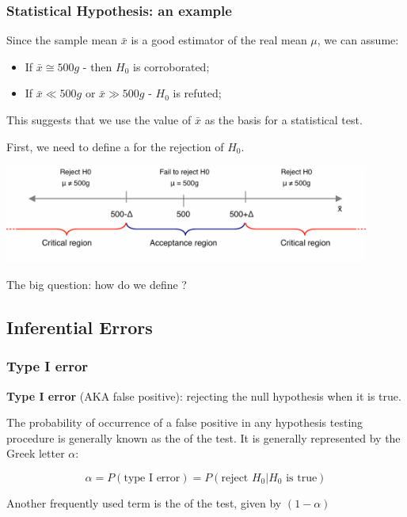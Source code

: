 \documentclass[10pt]{beamer}
\begin{document}
\begin{frame}
  \frametitle{Statistical Hypothesis: an example} 
  Since the sample mean $\bar{x}$ is a good estimator of the real mean
  $\mu$, we can assume:
  
  \medskip

  \begin{itemize}
  \item If $\bar{x} \cong 500g$ - then $H_0$ is corroborated;
  \item If $\bar{x} \ll 500g$ or $\bar{x} \gg 500g$ - $H_0$ is refuted;
  \end{itemize}
  
  \medskip

  This suggests that we use the value of $\bar{x}$ as the basis for a
  statistical test.
  
  \vfill

  First, we need to define a  for the rejection of $H_0$.
  \begin{center}
    \includegraphics[width=0.9\textwidth]{img/criticalregion}
  \end{center}
  \hfill The big question: how do we define \structure{$\Delta$}?
\end{frame}

\subsection{Inferential Errors}
\begin{frame}
  \frametitle{Type I error}
  \begin{block}{}
    {\bf Type I error} (AKA false positive): rejecting the null
    hypothesis when it is true.
  \end{block}
  
  \vspace{1cm}

  The probability of occurrence of a false positive in any hypothesis
  testing procedure is generally known as the  of the test. It is generally represented by the Greek
  letter $\alpha$:

  \begin{equation*}
    \alpha = P(\text{type I error}) = P(\text{reject } H_0|H_0 \text{ is true})
  \end{equation*}

  Another frequently used term is the  of
  the test, given by $(1-\alpha)$
\end{frame}
\end{document}
